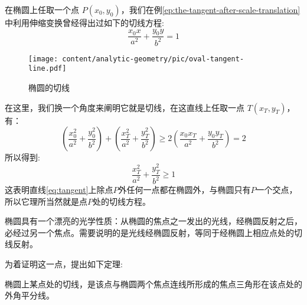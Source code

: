 在椭圆上任取一个点 $P(x_0,y_0)$，我们在例\ref{ep:the-tangent-after-scale-translation}中利用伸缩变换曾经得出过如下的切线方程:
\begin{equation}
\frac{x_0x}{a^2}+\frac{y_0y}{b^2}=1 \label{eq:tangent}
\end{equation}
\begin{center}
\end{center}

\begin{figure}[htbp]
  \centering
\texttt{[image: content/analytic-geometry/pic/oval-tangent-line.pdf]}
\caption{椭圆的切线}
\label{fig:oval-tangent-line}
\end{figure}

在这里，我们换一个角度来阐明它就是切线，在这直线上任取一点 $T(x_T,y_T)$，有：
\begin{equation}
(\frac{x_0^2}{a^2}+\frac{y_0^2}{b^2})+(\frac{x_T^2}{a^2}+\frac{y_T^2}{b^2}) \geqslant 2(\frac{x_0x_T}{a^2}+\frac{y_0y_T}{b^2})=2
\end{equation}
所以得到:
\begin{equation}
\frac{x_T^2}{a^2}+\frac{y_T^2}{b^2} \geqslant 1
\end{equation}
这表明直线\ref{eq:tangent}上除点$P$外任何一点都在椭圆外，与椭圆只有$P$一个交点，所以它理所当然就是点$P$处的切线方程。

椭圆具有一个漂亮的光学性质：从椭圆的焦点之一发出的光线，经椭圆反射之后，必经过另一个焦点。需要说明的是光线经椭圆反射，等同于经椭圆上相应点处的切线反射。

为着证明这一点，提出如下定理:
\begin{theorem}[椭圆切线定理]
  椭圆上某点处的切线，是该点与椭圆两个焦点连线所形成的焦点三角形在该点处的外角平分线。
\end{theorem}

